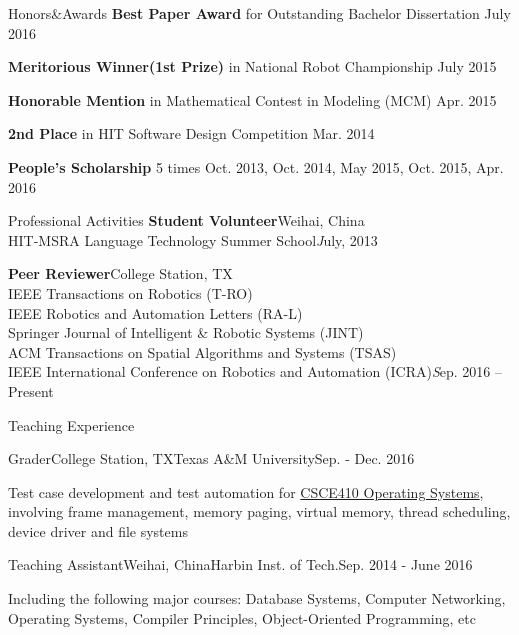\documentclass{resume} %
\begin{document}
\begin{rSection}{Honors\&Awards}
{\bf Best Paper Award}{ for Outstanding Bachelor Dissertation} \hfill {July 2016}
\vspace*{-0.4em}

{\bf Meritorious Winner(1st Prize)}{ in National Robot Championship} \hfill {July 2015}
\vspace*{-0.4em}

{\bf Honorable Mention}{ in Mathematical Contest in Modeling (MCM)} \hfill {Apr. 2015}
\vspace*{-0.4em}

{\bf 2nd Place}{ in HIT Software Design Competition} \hfill {Mar. 2014} 
\vspace*{-0.4em}

{\bf People's Scholarship} 5 times \hfill {Oct. 2013, Oct. 2014, May 2015, Oct. 2015, Apr. 2016}
\vspace*{-0.4em}

\end{rSection}

\begin{rSection}{Professional Activities}
{\bf Student Volunteer}\hfill Weihai, China\\
HIT-MSRA Language Technology Summer School\hfill {\emph July, 2013}
\vspace*{-0.2em}

{\bf Peer Reviewer}\hfill College Station, TX\\
IEEE Transactions on Robotics (T-RO)\\
IEEE Robotics and Automation Letters (RA-L)\\
Springer Journal of Intelligent \& Robotic Systems (JINT)\\
ACM Transactions on Spatial Algorithms and Systems (TSAS)\\
IEEE International Conference on Robotics and Automation (ICRA)\hfill {\emph Sep. 2016 -- Present}
\end{rSection}

\begin{rSection}{Teaching Experience}
\begin{rSubsection}{Grader}{College Station, TX}{Texas A\&M University}{Sep. - Dec. 2016}
\item Test case development and test automation for \href{http://faculty.cse.tamu.edu/dilma/web-csce410-fall16/index.htm}{CSCE410 Operating Systems}, involving frame management, memory paging, virtual memory, thread scheduling, device driver and file systems
\end{rSubsection}

\begin{rSubsection}{Teaching Assistant}{Weihai, China}{Harbin Inst. of Tech.}{Sep. 2014 - June 2016}
\item Including the following major courses: Database Systems, Computer Networking, Operating Systems, Compiler Principles, Object-Oriented Programming, etc
\end{rSubsection}
\end{rSection}
\end{document}
